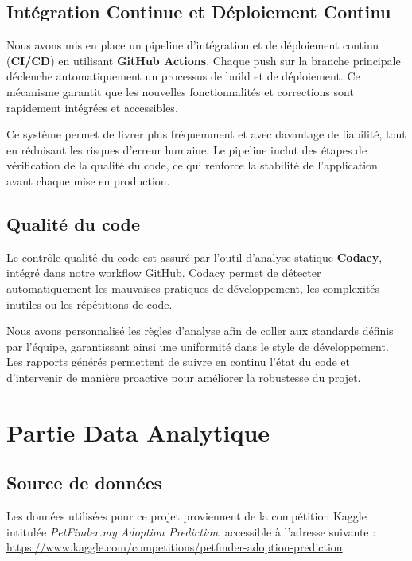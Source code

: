 \documentclass[a4paper,12pt]{article}
\begin{document}
\subsection{Intégration Continue et Déploiement Continu}

Nous avons mis en place un pipeline d’intégration et de déploiement continu (\textbf{CI/CD}) en utilisant \textbf{GitHub Actions}. Chaque push sur la branche principale déclenche automatiquement un processus de build et de déploiement. Ce mécanisme garantit que les nouvelles fonctionnalités et corrections sont rapidement intégrées et accessibles.

Ce système permet de livrer plus fréquemment et avec davantage de fiabilité, tout en réduisant les risques d’erreur humaine. Le pipeline inclut des étapes de vérification de la qualité du code, ce qui renforce la stabilité de l’application avant chaque mise en production.

\subsection {Qualité du code}

Le contrôle qualité du code est assuré par l’outil d’analyse statique \textbf{Codacy}, intégré dans notre workflow GitHub. Codacy permet de détecter automatiquement les mauvaises pratiques de développement, les complexités inutiles ou les répétitions de code.

Nous avons personnalisé les règles d’analyse afin de coller aux standards définis par l’équipe, garantissant ainsi une uniformité dans le style de développement. Les rapports générés permettent de suivre en continu l’état du code et d’intervenir de manière proactive pour améliorer la robustesse du projet.

\section{Partie Data Analytique}

\subsection {Source de données}

Les données utilisées pour ce projet proviennent de la compétition Kaggle intitulée \textit{PetFinder.my Adoption Prediction}, accessible à l'adresse suivante :\\[0.5em]
\url{https://www.kaggle.com/competitions/petfinder-adoption-prediction}
\end{document}
